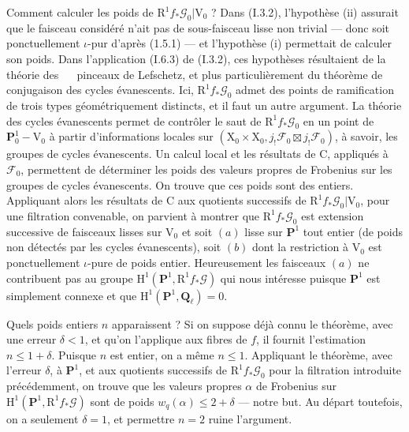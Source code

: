 \documentclass[11pt,leqno]{article}
\newcommand{\Page}[1]{\ifvmode\noindent\else\unskip\ \fi{\footnotesize\textcolor{gray}{[p.\,#1]}}\ \ignorespaces}
\begin{document}
Comment calculer les poids de \(\mathrm{R}^1 f_*\mathscr{G}_0|\mathrm{V}_0\) ? Dans (I.3.2), l’hypothèse (ii) assurait que le faisceau considéré n’ait pas de sous-faisceau lisse non trivial — donc soit ponctuellement \(\iota\)-pur d’après (1.5.1) — et l’hypothèse (i) permettait de calculer son poids. Dans l’application (I.6.3) de (I.3.2), ces hypothèses résultaient de la théorie des
\Page{141}
pinceaux de Lefschetz, et plus particulièrement du théorème de conjugaison des cycles évanescents. Ici, \(\mathrm{R}^1 f_*\mathscr{G}_0\) admet des points de ramification de trois types géométriquement distincts, et il faut un autre argument. La théorie des cycles évanescents permet de contrôler le saut de \(\mathrm{R}^1 f_*\mathscr{G}_0\) en un point de \(\mathbf{P}_0^1-\mathrm{V}_0\) à partir d’informations locales sur \((\mathrm{X}_0\times\mathrm{X}_0,j_!\mathscr{F}_0\boxtimes j_!\mathscr{F}_0)\), à savoir, les groupes de cycles évanescents. Un calcul local et les résultats de C, appliqués à \(\mathscr{F}_0\), permettent de déterminer les poids des valeurs propres de Frobenius sur les groupes de cycles évanescents. On trouve que ces poids sont des entiers. Appliquant alors les résultats de C aux quotients successifs de \(\mathrm{R}^1 f_*\mathscr{G}_0|\mathrm{V}_0\), pour une filtration convenable, on parvient à montrer que \(\mathrm{R}^1 f_*\mathscr{G}_0\) est extension successive de faisceaux lisses sur \(\mathrm{V}_0\) et soit \((a)\) lisse sur \(\mathbf{P}^1\) tout entier (de poids non détectés par les cycles évanescents), soit \((b)\) dont la restriction à \(\mathrm{V}_0\) est ponctuellement \(\iota\)-pure de poids entier. Heureusement les faisceaux \((a)\) ne contribuent pas au groupe \(\mathrm{H}^1(\mathbf{P}^1,\mathrm{R}^1 f_*\mathscr{G})\) qui nous intéresse puisque \(\mathbf{P}^1\) est simplement connexe et que \(\mathrm{H}^1(\mathbf{P}^1,\mathbf{Q}_\ell)=0\).

Quels poids entiers \(n\) apparaissent ? Si on suppose déjà connu le théorème, avec une erreur \(\delta<1\), et qu’on l’applique aux fibres de \(f\), il fournit l’estimation \(n\leq 1+\delta\). Puisque \(n\) est entier, on a même \(n\leq 1\). Appliquant le théorème, avec l’erreur \(\delta\), à \(\mathbf{P}^1\), et aux quotients successifs de \(\mathrm{R}^1 f_*\mathscr{G}_0\) pour la filtration introduite précédemment, on trouve que les valeurs propres \(\alpha\) de Frobenius sur \(\mathrm{H}^1(\mathbf{P}^1,\mathrm{R}^1 f_*\mathscr{G})\) sont de poids \(w_q(\alpha)\leq 2+\delta\) — notre but. Au départ toutefois, on a seulement \(\delta=1\), et permettre \(n=2\) ruine l’argument.
\end{document}
